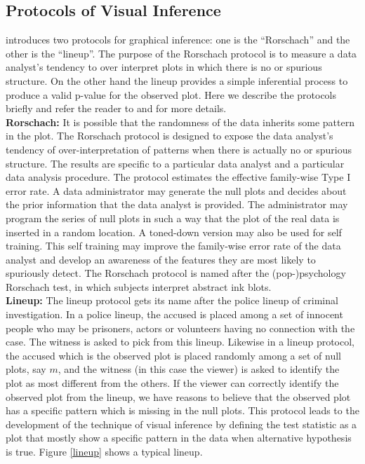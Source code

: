 \subsection{Protocols of Visual Inference} \label{sec:protocol} \citet{buja:2009} introduces two protocols for graphical inference: one is the  ``Rorschach'' and the other is the ``lineup''. The purpose of the Rorschach protocol is to measure a data analyst's tendency to over interpret plots in which there is no or spurious structure. On the other hand the lineup provides a simple inferential process to produce a valid p-value for the observed plot. Here we describe the protocols briefly and refer the reader to \citet{buja:2009} and \cite{hadley:2010} for more details. \\

{\bf Rorschach:} It is possible that the randomness of the data inherits some pattern in the plot. The Rorschach protocol is designed to expose the data analyst's tendency of over-interpretation of patterns when there is actually no or spurious structure. The results are specific to a particular data analyst and a particular data analysis procedure. The protocol estimates the effective family-wise Type I error rate. A data administrator may generate the null plots and decides about the prior information that the data analyst is provided. The administrator may program the series of null plots in such a way that the plot of the real data is inserted in a random location. A toned-down version may also be used for self training. This self training may improve the family-wise error rate of the data analyst and develop an awareness of the features they are most likely to spuriously detect. 
The Rorschach protocol is named after the (pop-)psychology Rorschach test, in which subjects interpret abstract ink blots. \\

{\bf Lineup:} The lineup protocol gets its name after the police lineup of criminal investigation. In a police lineup, the accused is placed among a set of innocent people who may be prisoners, actors or volunteers having no connection with the case. The witness is asked to pick from this lineup. Likewise in a lineup protocol, the accused which is the observed plot is placed randomly among a set of null plots, say $m$, and the witness (in this case the viewer) is asked to identify the plot as most different from the others. If the viewer  can correctly identify the observed plot from the lineup, we have reasons to believe that the observed plot has a specific pattern which is missing in the null plots. This protocol leads to the development of the technique of visual inference by defining the test statistic as a plot that mostly show a specific pattern in the data when alternative hypothesis is true. Figure \ref{lineup} shows a typical lineup. \\

